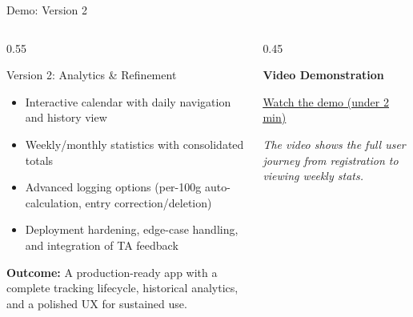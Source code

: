 \documentclass[aspectratio=169]{beamer}
\begin{document}
\begin{frame}{Demo: Version 2}
    \vspace{0.3cm}
    
    \begin{columns}[T]
        \begin{column}{0.55\textwidth}
            \begin{block}{\faRocket{} Version 2: Analytics \& Refinement}
                \begin{itemize}
                    \small
                    \item Interactive calendar with daily navigation and history view
                    \item Weekly/monthly statistics with consolidated totals
                    \item Advanced logging options (per-100g auto-calculation, entry correction/deletion)
                    \item Deployment hardening, edge-case handling, and integration of TA feedback
                \end{itemize}
                \smallskip
                \textbf{Outcome:} A production-ready app with a complete tracking lifecycle, historical analytics, and a polished UX for sustained use.
            \end{block}
        \end{column}
        \begin{column}{0.45\textwidth}
            \begin{center}
                \Huge \faVideoCamera{}
                \vspace{0.2cm}
                
                \textbf{Video Demonstration}
                \vspace{0.3cm}
                
                \href{https://www.youtube.com/watch?v=YOUR_VIDEO_ID}{
                    \color{blue}\underline{Watch the demo (under 2 min)}
                }
                
                \vspace{0.3cm}
                \small
                \textit{The video shows the full user journey from registration to viewing weekly stats.}
            \end{center}
        \end{column}
    \end{columns}
\end{frame}
\end{document}
